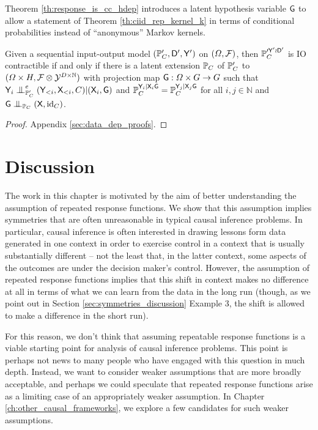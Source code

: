 Theorem \ref{th:response_is_cc_hdep} introduces a latent hypothesis variable $\mathsf{G}$ to allow a statement of Theorem \ref{th:ciid_rep_kernel_k} in terms of conditional probabilities instead of ``anonymous'' Markov kernels.

\begin{theorem}\label{th:response_is_cc_hdep}
Given a sequential input-output model $(\mathbb{P}_C',\mathsf{D}',\mathsf{Y}')$ on $(\Omega,\mathcal{F})$, then $\mathbb{P}_C^{\prime \mathsf{Y}'\wr \mathsf{D}'}$ is IO contractible if and only if there is a latent extension $\mathbb{P}_C$ of $\mathbb{P}_C'$ to $(\Omega\times H,\mathcal{F}\otimes\mathcal{Y}^{D\times\mathbb{N}})$ with projection map $\mathsf{G}:\Omega\times G\to G$ such that $\RV{Y}_i\CI^e_{\prob{P}_C'} (\RV{Y}_{<i},\RV{X}_{<i},C)|(\RV{X}_i,\RV{G})$ and $\mathbb{P}_C^{\mathsf{Y}_i|\mathsf{X}_i\mathsf{G}}=\mathbb{P}_C^{\mathsf{Y}_j|\mathsf{X}_j\mathsf{G}}$ for all $i,j\in \mathbb{N}$ and $\RV{G}\CI_{\prob{P}_C} (\RV{X},\text{id}_C)$.
\end{theorem}

\begin{proof}
Appendix \ref{sec:data_dep_proofs}.
\end{proof}

\section{Discussion}\label{sec:discussion}

The work in this chapter is motivated by the aim of better understanding the assumption of repeated response functions. We show that this assumption implies symmetries that are often unreasonable in typical causal inference problems. In particular, causal inference is often interested in drawing lessons form data generated in one context in order to exercise control in a context that is usually substantially different -- not the least that, in the latter context, some aspects of the outcomes are under the decision maker's control. However, the assumption of repeated response functions implies that this shift in context makes no difference at all in terms of what we can learn from the data in the long run (though, as we point out in Section \ref{sec:symmetries_discussion} Example 3, the shift is allowed to make a difference in the short run).

For this reason, we don't think that assuming repeatable response functions is a viable starting point for analysis of causal inference problems. This point is perhaps not news to many people who have engaged with this question in much depth. Instead, we want to consider weaker assumptions that are more broadly acceptable, and perhaps we could speculate that repeated response functions arise as a limiting case of an appropriately weaker assumption. In Chapter \ref{ch:other_causal_frameworks}, we explore a few candidates for such weaker assumptions.

